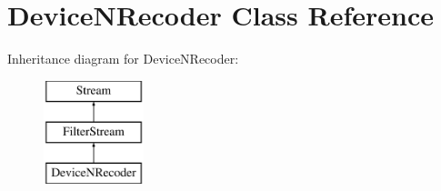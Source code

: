 \hypertarget{class_device_n_recoder}{}\section{Device\+N\+Recoder Class Reference}
\label{class_device_n_recoder}
Inheritance diagram for Device\+N\+Recoder\+:\begin{figure}[H]
\begin{center}
\leavevmode
\includegraphics[height=3.000000cm]{class_device_n_recoder}
\end{center}
\end{figure}
